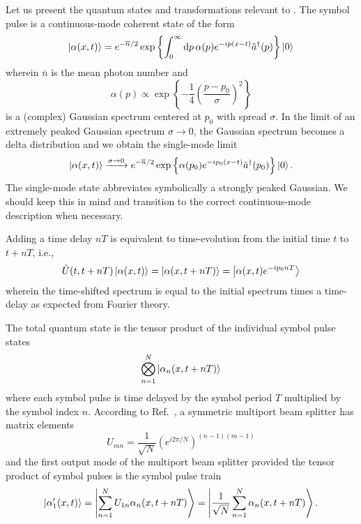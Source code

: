 Let us present the quantum states and transformations relevant to .
The symbol pulse is a continuous-mode coherent state of the form
\begin{equation}
	\ket{\alpha(x,t)}
	=
	e^{-\overline{n}/2}
	\exp\left\{
		\int_0^\infty\dd{p}
		\alpha(p)
		e^{-ip(x-t)}
		\hat{a}^\dagger(p)
	\right\}
	\ket{0}
\end{equation}
wherein $\overline{n}$ is the mean photon number and
\begin{equation}
	\alpha(p)
	\propto
	\exp\left\{
		-\frac{1}{4}\left(\frac{p-p_0}{\sigma}\right)^2
	\right\}
\end{equation}
is a (complex) Gaussian spectrum centered at $p_0$ with spread $\sigma$.
In the limit of an extremely peaked Gaussian spectrum $\sigma\to0$, the Gaussian spectrum becomes a delta distribution and we obtain the single-mode limit
\begin{equation}
	\ket{\alpha(x,t)}
	\xrightarrow{\sigma\to0}
	e^{-\overline{n}/2}
	\exp\left\{
		\alpha(p_0)
		e^{-ip_0(x-t)}
		\hat{a}^\dagger(p_0)
	\right\}
	\ket{0}
	.
\end{equation}
The single-mode state abbreviates symbolically a strongly peaked Gaussian.
We should keep this in mind and transition to the correct continuous-mode description when necessary.

Adding a time delay $nT$ is equivalent to time-evolution from the initial time $t$ to $t+nT$, i.e.,
\begin{equation}
	\hat{U}(t,t+nT)
	\ket{\alpha(x,t)}
	=
	\ket{\alpha(x,t+nT)}
	=
	\ket{\alpha(x,t)e^{-ip_0nT}}
\end{equation}
wherein the time-shifted spectrum is equal to the initial spectrum times a time-delay as expected from Fourier theory.

The total quantum state is the tensor product of the individual symbol pulse states
\begin{equation}
	\bigotimes_{n=1}^N
	\ket{\alpha_n(x,t+nT)}
\end{equation}
where each symbol pulse is time delayed by the symbol period $T$ multiplied by the symbol index $n$.
According to Ref.~\cite{Zukowski1997}, a symmetric multiport beam splitter has matrix elements
\begin{equation}
	U_{mn}
	=
	\frac{1}{\sqrt{N}}
	\left(e^{i2\pi/N}\right)^{(n-1)(m-1)}
\end{equation}
and the first output mode of the multiport beam splitter provided the tensor product of symbol pulses is the symbol pulse train
\begin{equation}
	\ket{\alpha_1^\prime(x,t)}
	=
	\ket{\sum_{n=1}^NU_{1n}\alpha_n(x,t+nT)}
	=
	\ket{\frac{1}{\sqrt{N}}\sum_{n=1}^N\alpha_n(x,t+nT)}
	.
\end{equation}

